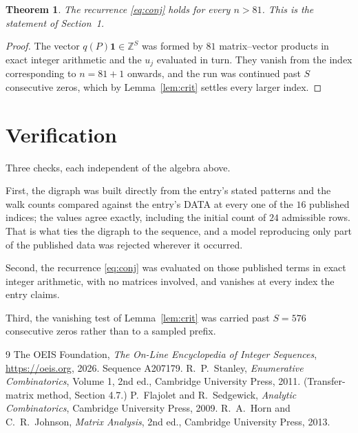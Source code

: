 \documentclass[11pt,a4paper]{article}
\theoremstyle{plain}
\newtheorem{theorem}{Theorem}
\theoremstyle{definition}
\begin{document}
\begin{theorem}
The recurrence \eqref{eq:conj} holds for every $n>81$. This is the statement of
Section~1.
\end{theorem}

\begin{proof}
The vector $q(P)\mathbf{1}\in\mathbb{Z}^{S}$ was formed by $81$ matrix--vector
products in exact integer arithmetic and the $u_j$ evaluated in turn. They vanish from the
index corresponding to $n=81+1$ onwards, and the run was continued past $S$ consecutive
zeros, which by Lemma~\ref{lem:crit} settles every larger index.
\end{proof}

\section{Verification}

Three checks, each independent of the algebra above.

First, the digraph was built directly from the entry's stated patterns and the walk counts
compared against the entry's DATA at every one of the $16$ published indices; the
values agree exactly, including the initial count of $24$ admissible rows. That is
what ties the digraph to the sequence, and a model reproducing only part of the published
data was rejected wherever it occurred.

Second, the recurrence \eqref{eq:conj} was evaluated on those published terms in exact
integer arithmetic, with no matrices involved, and vanishes at every index the entry claims.

Third, the vanishing test of Lemma~\ref{lem:crit} was carried past $S=576$ consecutive
zeros rather than to a sampled prefix.

\begin{thebibliography}{9}
 The OEIS Foundation, \emph{The On-Line Encyclopedia of Integer
Sequences}, \url{https://oeis.org}, 2026. Sequence A207179.
 R.~P.~Stanley, \emph{Enumerative Combinatorics}, Volume 1, 2nd ed.,
Cambridge University Press, 2011. (Transfer-matrix method, Section 4.7.)
 P.~Flajolet and R.~Sedgewick, \emph{Analytic Combinatorics}, Cambridge
University Press, 2009.
 R.~A.~Horn and C.~R.~Johnson, \emph{Matrix Analysis}, 2nd ed., Cambridge
University Press, 2013.
\end{thebibliography}
\end{document}
